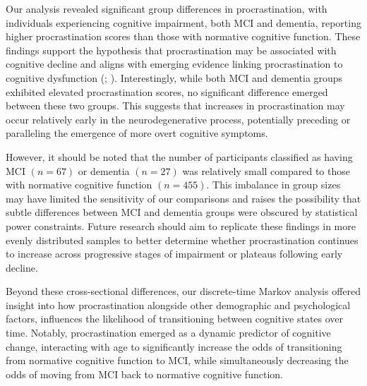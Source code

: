 \documentclass[
]{article}
\begin{document}
Our analysis revealed significant group differences in procrastination,
with individuals experiencing cognitive impairment, both MCI and
dementia, reporting higher procrastination scores than those with
normative cognitive function. These findings support the hypothesis that
procrastination may be associated with cognitive decline and aligns with
emerging evidence linking procrastination to cognitive dysfunction
(; ). Interestingly, while both MCI and dementia groups
exhibited elevated procrastination scores, no significant difference
emerged between these two groups. This suggests that increases in
procrastination may occur relatively early in the neurodegenerative
process, potentially preceding or paralleling the emergence of more
overt cognitive symptoms.

However, it should be noted that the number of participants classified
as having MCI \((n = 67)\) or dementia \((n = 27)\) was relatively small
compared to those with normative cognitive function \((n = 455)\). This
imbalance in group sizes may have limited the sensitivity of our
comparisons and raises the possibility that subtle differences between
MCI and dementia groups were obscured by statistical power constraints.
Future research should aim to replicate these findings in more evenly
distributed samples to better determine whether procrastination
continues to increase across progressive stages of impairment or
plateaus following early decline.

Beyond these cross-sectional differences, our discrete-time Markov
analysis offered insight into how procrastination alongside other
demographic and psychological factors, influences the likelihood of
transitioning between cognitive states over time. Notably,
procrastination emerged as a dynamic predictor of cognitive change,
interacting with age to significantly increase the odds of transitioning
from normative cognitive function to MCI, while simultaneously
decreasing the odds of moving from MCI back to normative cognitive
function.
\end{document}
